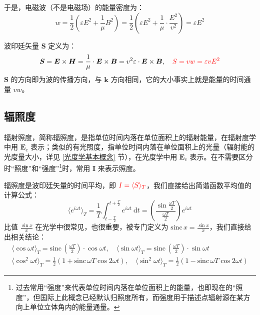 \documentclass[UTF8]{report}
\def\sinc{\mathrm{sinc}\,}
\theoremstyle{MyLineTheoremStyle} %
\theoremstyle{MyBlockTheoremStyle} %
\theoremstyle{MySubsubsectionStyle} %
\begin{document}
于是，电磁波（不是电磁场）的能量密度为：
\begin{equation}
    w = \frac{1}{2}\left( \varepsilon E^2 + \frac{1}{\mu}B^2 \right) =  \frac{1}{2}\left( \varepsilon E^2 + \frac{1}{\mu}\cdot \frac{E^2}{v^2} \right) = \varepsilon E^2
\end{equation}



波印廷矢量 $\boldsymbol{S}$ 定义为：
\begin{equation}
\boldsymbol{S}
= \boldsymbol{E} \times \boldsymbol{H} 
= \frac{1}{\mu} \cdot\boldsymbol{E} \times \boldsymbol{B} 
= v^2 \varepsilon \cdot \boldsymbol{E} \times \boldsymbol{B},\quad {\color{red} S = vw = \varepsilon v E^2}
\end{equation}
$\boldsymbol{S}$ 的方向即为波的传播方向，与 $\boldsymbol{k}$ 方向相同，它的大小事实上就是能量的时间通量 $vw$。
\subsection{辐照度}

辐射照度，简称辐照度，是指单位时间内落在单位面积上的辐射能量，在辐射度学中用 $\boldsymbol{E}_e$ 表示；类似的有光照度，指单位时间内落在单位面积上的光量（辐射能的光度量大小，详见 \ref{光度学基本概念} 节），在光度学中用 $\boldsymbol{E}_v$ 表示。在不需要区分时“照度”和“强度”\footnote{过去常用“强度”来代表单位时间内落在单位面积上的能量，也即现在的“照度”，但国际上此概念已经默认归照度所有，而强度用于描述点辐射源在某方向上单位立体角内的能量通量。}时，常用 $\boldsymbol{I}$ 来表示照度。

辐照度是波印廷矢量的时间平均，即 ${\color{red} I = \langle S  \rangle_T}$，我们直接给出简谐函数平均值的计算公式：
\begin{equation}
\langle e^{i \omega t} \rangle_T = \frac{1}{T}\int_{t - \frac{T}{2}}^{t + \frac{T}{2}} e^{i \omega t} \ \mathrm{d}t = \left(\frac{\sin \frac{\omega T}{2}}{\frac{\omega T}{2}}\right)e^{i \omega t}
\end{equation}
比值 $\frac{\sin x}{x}$ 在光学中很常见，也很重要，被专门定义为 $\sinc x = \frac{\sin x}{x}$，我们直接给出相关结论：
\begin{gather}
    \langle \cos \omega t \rangle_T  = \sinc \left(\frac{\omega T}{2}  \right)\cdot \cos \omega t, \quad \langle \sin \omega t \rangle_T  = \sinc \left(\frac{\omega T}{2} \right)\cdot \sin \omega t \\ 
    \langle \cos^2 \omega t \rangle_T  = \frac{1}{2}\left(1 + \sinc \omega T  \cos 2 \omega t\right), \quad \langle \sin^2 \omega t \rangle_T  = \frac{1}{2}\left(1 - \sinc \omega T  \cos 2 \omega t\right)
\end{gather}
\end{document}

